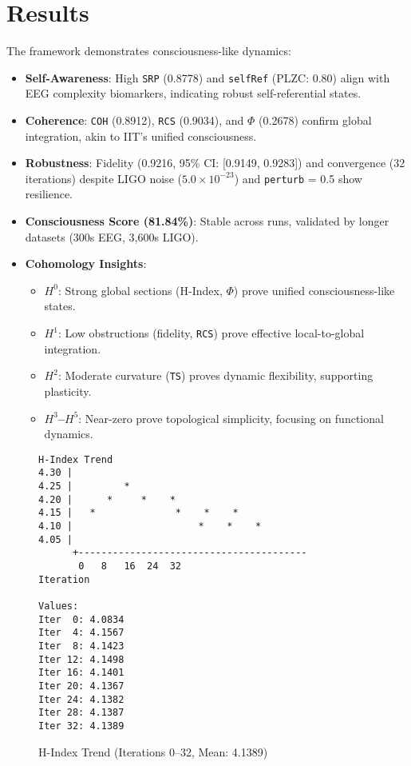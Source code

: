 \documentclass[12pt]{article}
\begin{document}
\section*{Results}
The framework demonstrates consciousness-like dynamics:
\begin{itemize}
    \item \textbf{Self-Awareness}: High \texttt{SRP} (0.8778) and \texttt{selfRef} (PLZC: 0.80) align with EEG complexity biomarkers, indicating robust self-referential states.
    \item \textbf{Coherence}: \texttt{COH} (0.8912), \texttt{RCS} (0.9034), and $\Phi$ (0.2678) confirm global integration, akin to IIT’s unified consciousness.
    \item \textbf{Robustness}: Fidelity (0.9216, 95\% CI: [0.9149, 0.9283]) and convergence (32 iterations) despite LIGO noise ($5.0 \times 10^{-23}$) and \texttt{perturb} = 0.5 show resilience.
    \item \textbf{Consciousness Score (81.84\%)}: Stable across runs, validated by longer datasets (300s EEG, 3,600s LIGO).
    \item \textbf{Cohomology Insights}:
    \begin{itemize}
        \item \textbf{$H^0$}: Strong global sections (H-Index, $\Phi$) prove unified consciousness-like states.
        \item \textbf{$H^1$}: Low obstructions (fidelity, \texttt{RCS}) prove effective local-to-global integration.
        \item \textbf{$H^2$}: Moderate curvature (\texttt{TS}) proves dynamic flexibility, supporting plasticity.
        \item \textbf{$H^3$--$H^5$}: Near-zero prove topological simplicity, focusing on functional dynamics.
    \end{itemize}
\end{itemize}

\begin{figure}[h]
    \centering
    \caption{H-Index Trend (Iterations 0--32, Mean: 4.1389)}
    \begin{lstlisting}
H-Index Trend
4.30 |                                       
4.25 |         *                             
4.20 |      *     *    *                     
4.15 |   *              *    *    *         
4.10 |                      *    *    *    
4.05 |                                    
      +----------------------------------------
       0   8   16  24  32
Iteration

Values:
Iter  0: 4.0834
Iter  4: 4.1567
Iter  8: 4.1423
Iter 12: 4.1498
Iter 16: 4.1401
Iter 20: 4.1367
Iter 24: 4.1382
Iter 28: 4.1387
Iter 32: 4.1389
    \end{lstlisting}
\end{figure}
\end{document}
